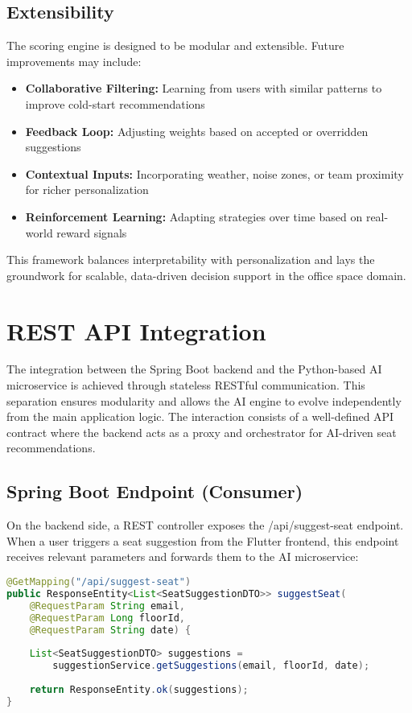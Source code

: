 \documentclass[12pt,a4paper]{report}
\begin{document}
\subsection*{Extensibility}

The scoring engine is designed to be modular and extensible. Future improvements may include:
\begin{itemize}
\item \textbf{Collaborative Filtering:} Learning from users with similar patterns to improve cold-start recommendations
\item \textbf{Feedback Loop:} Adjusting weights based on accepted or overridden suggestions
\item \textbf{Contextual Inputs:} Incorporating weather, noise zones, or team proximity for richer personalization
\item \textbf{Reinforcement Learning:} Adapting strategies over time based on real-world reward signals
\end{itemize}

This framework balances interpretability with personalization and lays the groundwork for scalable, data-driven decision support in the office space domain.

\section{REST API Integration}

The integration between the Spring Boot backend and the Python-based AI microservice is achieved through stateless RESTful communication. This separation ensures modularity and allows the AI engine to evolve independently from the main application logic. The interaction consists of a well-defined API contract where the backend acts as a proxy and orchestrator for AI-driven seat recommendations.

\subsection*{Spring Boot Endpoint (Consumer)}

On the backend side, a REST controller exposes the /api/suggest-seat endpoint. When a user triggers a seat suggestion from the Flutter frontend, this endpoint receives relevant parameters and forwards them to the AI microservice:

\begin{lstlisting}[language=Java, caption=Spring Boot Controller]
@GetMapping("/api/suggest-seat")
public ResponseEntity<List<SeatSuggestionDTO>> suggestSeat(
    @RequestParam String email,
    @RequestParam Long floorId,
    @RequestParam String date) {
    
    List<SeatSuggestionDTO> suggestions = 
        suggestionService.getSuggestions(email, floorId, date);
        
    return ResponseEntity.ok(suggestions);
}
\end{lstlisting}
\end{document}
